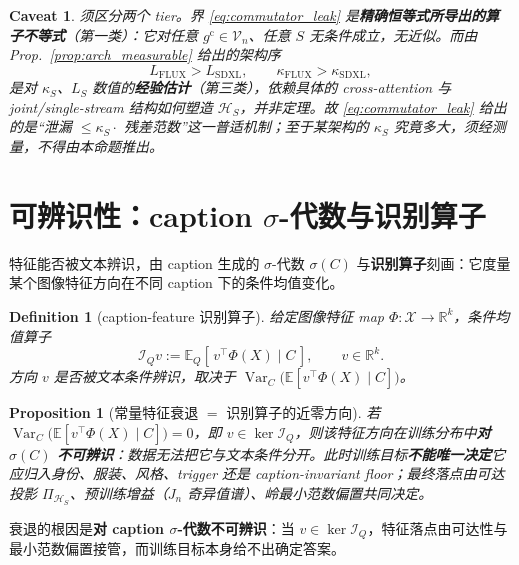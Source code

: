 \documentclass[11pt,a4paper]{article}
\newtheorem{proposition}[theorem]{Proposition}
\newtheorem{definition}[theorem]{Definition}
\newtheorem{caveat}[theorem]{Caveat}
\DeclareMathOperator{\Var}{Var}
\newcommand{\E}{\mathbb{E}}
\newcommand{\R}{\mathbb{R}}
\newcommand{\cH}{\mathcal{H}}
\newcommand{\cI}{\mathcal{I}}
\newcommand{\cV}{\mathcal{V}}
\newcommand{\cX}{\mathcal{X}}
\newcommand{\ProjectOp}{\Pi}
\newcommand{\cc}{\mathrm{c}}
\begin{document}
\begin{caveat}
须区分两个 tier。界 \eqref{eq:commutator_leak} 是\textbf{精确恒等式所导出的算子不等式}（第一类）：它对任意 $g^{\cc}\in\cV_n$、任意 $S$ 无条件成立，无近似。而由 Prop.~\ref{prop:arch_measurable} 给出的架构序
\[
L_{\mathrm{FLUX}}>L_{\mathrm{SDXL}},\qquad \kappa_{\mathrm{FLUX}}>\kappa_{\mathrm{SDXL}},
\]
是对 $\kappa_S$、$L_S$ 数值的\textbf{经验估计}（第三类），依赖具体的 cross-attention 与 joint/single-stream 结构如何塑造 $\cH_S$，并非定理。故 \eqref{eq:commutator_leak} 给出的是“泄漏 $\le \kappa_S\cdot$ 残差范数”这一普适机制；至于某架构的 $\kappa_S$ 究竟多大，须经测量，不得由本命题推出。
\end{caveat}

\section{可辨识性：caption $\sigma$-代数与识别算子}
\label{sec:identification}

特征能否被文本辨识，由 caption 生成的 $\sigma$-代数 $\sigma(C)$ 与\textbf{识别算子}刻画：它度量某个图像特征方向在不同 caption 下的条件均值变化。

\begin{definition}[caption-feature 识别算子]
给定图像特征 map $\Phi:\cX\to\R^k$，条件均值算子
\begin{equation}\label{eq:id_op}
\cI_Q v := \E_Q[\,v^\top\Phi(X)\mid C\,],\qquad v\in\R^k.
\end{equation}
方向 $v$ 是否被文本条件辨识，取决于 $\Var_C\!\bigl(\E[v^\top\Phi(X)\mid C]\bigr)$。
\end{definition}

\begin{proposition}[常量特征衰退 $=$ 识别算子的近零方向]\label{prop:decay_kernel}
若 $\Var_C\!\bigl(\E[v^\top\Phi(X)\mid C]\bigr)=0$，即 $v\in\ker\cI_Q$，则该特征方向在训练分布中\textbf{对 $\sigma(C)$ 不可辨识}：数据无法把它与文本条件分开。此时训练目标\textbf{不能唯一决定}它应归入身份、服装、风格、trigger 还是 caption-invariant floor；最终落点由可达投影 $\ProjectOp_{\cH_S}$、预训练增益（$J_n$ 奇异值谱）、岭最小范数偏置共同决定。
\end{proposition}

\noindent 衰退的根因是\textbf{对 caption $\sigma$-代数不可辨识}：当 $v\in\ker\cI_Q$，特征落点由可达性与最小范数偏置接管，而训练目标本身给不出确定答案。
\end{document}
